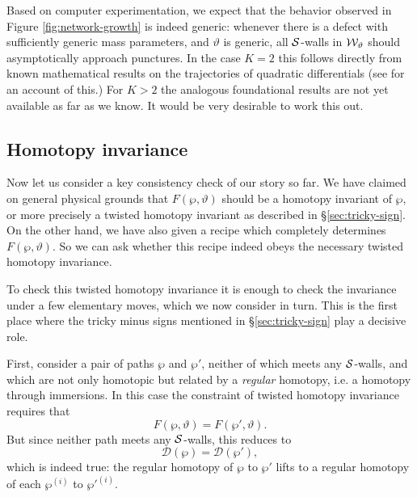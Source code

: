 \documentclass[11pt,a4paper]{article}
\def\wnet {{\cal W}}
\def\cS {{\cal S}}
\newcommand{\ti}[1]{\textit{#1}}
\def\wnet {{\cal W}}
\newcommand\cD{{\mathcal D}}
\begin{document}
Based on computer experimentation, we expect that the behavior observed in Figure \ref{fig:network-growth}
is indeed generic:  whenever there is a defect
with sufficiently generic mass parameters, and $\vartheta$ is generic, all $\cS$-walls in $\wnet_\vartheta$
should asymptotically
approach punctures.  In the case $K=2$ this follows directly from known mathematical results on the trajectories of
quadratic differentials \cite{MR743423} (see \cite{Gaiotto:2009hg} for an account of this.)
For $K>2$ the analogous foundational results
are not yet available as far as we know.  It would be very desirable to work this out.



\subsection{Homotopy invariance} \label{sec:homotopy-invariance}

Now let us consider a key consistency check of our story so far.
We have claimed on general physical grounds that $F(\wp, \vartheta)$ should be
a homotopy invariant of $\wp$, or more precisely a twisted homotopy invariant as
described in \S\ref{sec:tricky-sign}.
On the other hand, we have also given a recipe which completely determines $F(\wp, \vartheta)$.
So we can ask whether this recipe indeed obeys the necessary twisted homotopy invariance.

To check this twisted homotopy invariance it is enough to check the invariance under a few
elementary moves, which we now consider in turn.
This is the first place where the tricky
minus signs mentioned in \S\ref{sec:tricky-sign} play a decisive role.

First, consider a pair of paths $\wp$ and $\wp'$, neither of which meets any $\cS$-walls, and
which are not only homotopic but related by a \ti{regular}
homotopy, i.e. a homotopy through immersions.
In this case the constraint of twisted homotopy invariance requires that
\begin{equation}
 F(\wp, \vartheta) = F(\wp', \vartheta).
\end{equation}
But since neither path meets any $\cS$-walls, this reduces to
\begin{equation}
 \cD(\wp) = \cD(\wp'),
\end{equation}
which is indeed true:  the regular homotopy of $\wp$ to $\wp'$ lifts to
a regular homotopy of each $\wp^{(i)}$ to $\wp'^{(i)}$.
\end{document}
